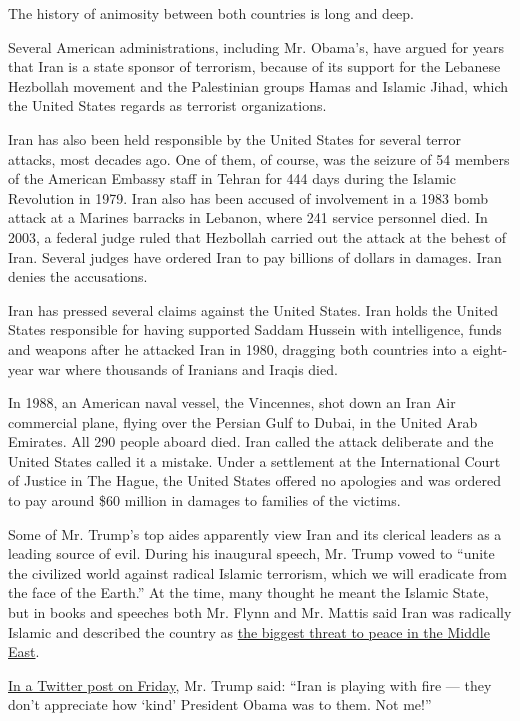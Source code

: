 The history of animosity between both countries is long and deep.

Several American administrations, including Mr. Obama's, have argued for
years that Iran is a state sponsor of terrorism, because of its support
for the Lebanese Hezbollah movement and the Palestinian groups Hamas and
Islamic Jihad, which the United States regards as terrorist
organizations.

Iran has also been held responsible by the United States for several
terror attacks, most decades ago. One of them, of course, was the
seizure of 54 members of the American Embassy staff in Tehran for 444
days during the Islamic Revolution in 1979. Iran also has been accused
of involvement in a 1983 bomb attack at a Marines barracks in Lebanon,
where 241 service personnel died. In 2003, a federal judge ruled that
Hezbollah carried out the attack at the behest of Iran. Several judges
have ordered Iran to pay billions of dollars in damages. Iran denies the
accusations.

Iran has pressed several claims against the United States. Iran holds
the United States responsible for having supported Saddam Hussein with
intelligence, funds and weapons after he attacked Iran in 1980, dragging
both countries into a eight-year war where thousands of Iranians and
Iraqis died.

In 1988, an American naval vessel, the Vincennes, shot down an Iran Air
commercial plane, flying over the Persian Gulf to Dubai, in the United
Arab Emirates. All 290 people aboard died. Iran called the attack
deliberate and the United States called it a mistake. Under a settlement
at the International Court of Justice in The Hague, the United States
offered no apologies and was ordered to pay around \$60 million in
damages to families of the victims.

Some of Mr. Trump's top aides apparently view Iran and its clerical
leaders as a leading source of evil. During his inaugural speech, Mr.
Trump vowed to ``unite the civilized world against radical Islamic
terrorism, which we will eradicate from the face of the Earth.'' At the
time, many thought he meant the Islamic State, but in books and speeches
both Mr. Flynn and Mr. Mattis said Iran was radically Islamic and
described the country as
\href{http://www.militarytimes.com/story/military/2016/04/22/mattis-csis-speech-iran/83397134/}{the
biggest threat to peace in the Middle East}.

\href{https://twitter.com/realDonaldTrump/status/827478751931924480?ref_src=twsrc\%5Etfw}{In
a Twitter post on Friday}, Mr. Trump said: ``Iran is playing with fire
--- they don't appreciate how `kind' President Obama was to them. Not
me!''

